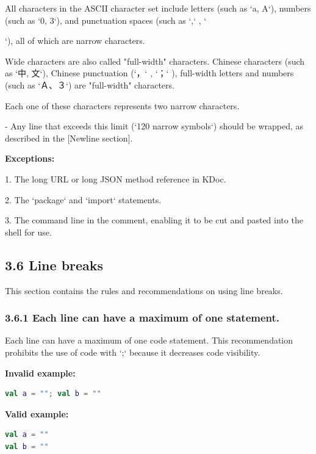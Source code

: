 All characters in the ASCII character set include letters (such as `a, A`), numbers (such as `0, 3`), and punctuation spaces (such as `,` , `{`), all of which are narrow characters.

Wide characters are also called "full-width" characters. Chinese characters (such as `中, 文`), Chinese punctuation (`，` , `；` ), full-width letters and numbers (such as `Ａ、３`) are "full-width" characters.

Each one of these characters represents two narrow characters.



- Any line that exceeds this limit (`120 narrow symbols`) should be wrapped, as described in the [Newline section]. 



\textbf{Exceptions:}



1.	The long URL or long JSON method reference in KDoc.

2.	The `package` and `import` statements.

3.	The command line in the comment, enabling it to be cut and pasted into the shell for use.



\subsection*{\textbf{3.6 Line breaks}}

This section contains the rules and recommendations on using line breaks.

\subsubsection*{\textbf{3.6.1 Each line can have a maximum of one statement.}}
\leavevmode\newline

Each line can have a maximum of one code statement. This recommendation prohibits the use of code with `;` because it decreases code visibility.



\textbf{Invalid example:}

\begin{lstlisting}[language=Kotlin]
val a = ""; val b = ""
\end{lstlisting}


\textbf{Valid example:}

\begin{lstlisting}[language=Kotlin]
val a = ""
val b = ""
\end{lstlisting}


}

